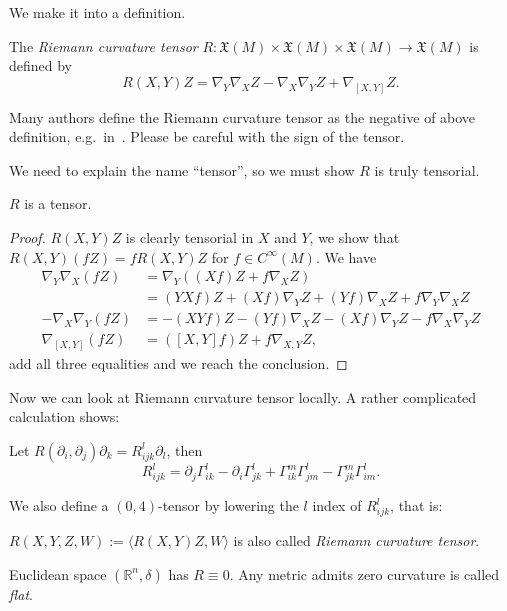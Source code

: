 We make it into a definition.

\begin{defn}
    The \emph{Riemann curvature tensor} $R:\mathfrak{X}(M)\times\mathfrak{X}(M)\times\mathfrak{X}(M)\to\mathfrak{X}(M)$ is defined by
    \[R(X,Y)Z=\nabla_Y\nabla_XZ-\nabla_X\nabla_YZ+\nabla_{[X,Y]}Z.\]
\end{defn}

\begin{rem}
    Many authors define the Riemann curvature tensor as the negative of above definition, e.g.\ in~\cite{Petersen}.
    Please be careful with the sign of the tensor.
\end{rem}

We need to explain the name ``tensor'', so we must show $R$ is truly tensorial.
\begin{lem}\label{R tensor}
    $R$ is a tensor.
\end{lem}
\begin{proof}
    $R(X,Y)Z$ is clearly tensorial in $X$ and $Y$, we show that $R(X,Y)(fZ)=fR(X,Y)Z$ for $f\in C^\infty(M)$.
    We have
    \begin{align*}
        \nabla_Y\nabla_X(fZ)&=\nabla_Y((Xf)Z+f\nabla_XZ)\\
        &=(YXf)Z+(Xf)\nabla_YZ+(Yf)\nabla_XZ+f\nabla_Y\nabla_XZ\\
        -\nabla_X\nabla_Y(fZ)&=-(XYf)Z-(Yf)\nabla_XZ-(Xf)\nabla_YZ-f\nabla_X\nabla_YZ\\
        \nabla_{[X,Y]}(fZ)&=([X,Y]f)Z+f\nabla_{{X,Y}}Z,
    \end{align*}
    add all three equalities and we reach the conclusion.
\end{proof}

Now we can look at Riemann curvature tensor locally.
A rather complicated calculation shows:
\begin{lem}
    Let $R(\partial_i,\partial_j)\partial_k=R^l_{ijk}\partial_l$, then
    \[R^l_{ijk}=\partial_j\Gamma^l_{ik}-\partial_i\Gamma^l_{jk}+\Gamma^m_{ik}\Gamma^l_{jm}-\Gamma^m_{jk}\Gamma^l_{im}.\]
\end{lem}

We also define a $(0,4)$-tensor by lowering the $l$ index of $R^l_{ijk}$, that is:
\begin{defn}
    $R(X,Y,Z,W):=\langle R(X,Y)Z,W\rangle$ is also called \emph{Riemann curvature tensor}.
\end{defn}

\begin{eg}
    Euclidean space $(\mathbb{R}^n,\delta)$ has $R\equiv 0$.
    Any metric admits zero curvature is called \emph{flat}.
\end{eg}

